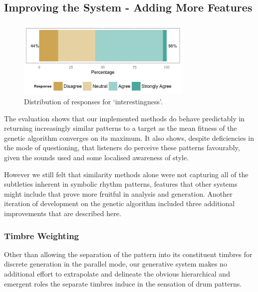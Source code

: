 {{{\subsection{Improving the System - Adding More Features}

\begin{figure}
	\begin{center}
		\includegraphics[width=0.75\textwidth]{ch03_symbolic/figures/interestingness.png}
	\end{center}
	\caption[Distribution of responses for `interestingness' in symbolic evaluation]{Distribution of responses for `interestingness'.}
	\label{fig:interesting_distribution}
\end{figure}

The evaluation shows that our implemented methods do behave predictably in returning increasingly similar patterns to a target as the mean fitness of the genetic algorithm converges on its maximum. It also shows, despite deficiencies in the mode of questioning, that listeners do perceive these patterns favourably, given the sounds used and some localised awareness of style.

However we still felt that similarity methods alone were not capturing all of the subtleties inherent in symbolic rhythm patterns, features that other systems might include that prove more fruitful in analysis and generation. Another iteration of development on the genetic algorithm included three additional improvements that are described here.

\subsubsection{Timbre Weighting}

\label{sec:timbre_weighting}

Other than allowing the separation of the pattern into its constituent timbres for discrete generation in the parallel mode, our generative system makes no additional effort to extrapolate and delineate the obvious hierarchical and emergent roles the separate timbres induce in the sensation of drum patterns. 

}}}
